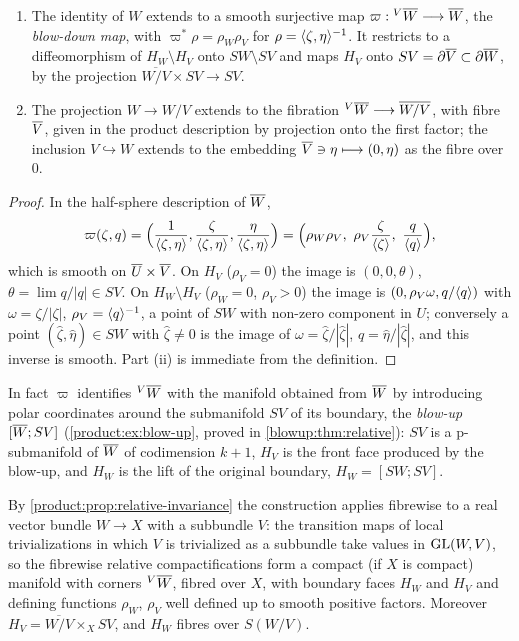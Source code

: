 \begin{proposition}\label{product:prop:blow-down}
\begin{enumerate}[label=\textup{(\roman*)}]
\item The identity of $W$ extends to a smooth surjective map
$\varpi:{}^{V}\overline{W}\longrightarrow\overline{W}$, the \emph{blow-down map}, with
$\varpi^*\rho=\rho_W\rho_V$ for $\rho=\langle \zeta,\eta\rangle^{-1}$. It restricts to a
diffeomorphism of $H_W\setminus H_V$ onto $SW\setminus SV$ and maps $H_V$ onto
$SV=\partial\overline{V}\subset\partial\overline{W}$, by the projection $\overline{W/V}\times SV
\longrightarrow SV$.
\item The projection $W\longrightarrow W/V$ extends to the fibration
${}^{V}\overline{W}\longrightarrow\overline{W/V}$, with fibre $\overline{V}$, given in the product
description by projection onto the first factor; the inclusion $V\hookrightarrow
W$ extends to the embedding $\overline{V}\ni\eta\longmapsto(0,\eta)$ as the fibre over
$0$.
\end{enumerate}
\end{proposition}

\begin{proof}
In the half-sphere description of $\overline{W}$,
\begin{equation*}
\varpi(\zeta,q)=\Big(\frac1{\ang{\zeta,\eta}},\frac{\zeta}{\ang{\zeta,\eta}},
\frac{\eta}{\ang{\zeta,\eta}}\Big)=\Big(\rho_W\rho_V,\ \rho_V\frac\zeta{\ang\zeta},
\ \frac q{\ang q}\Big),
\end{equation*}
which is smooth on $\overline{U}\times\overline{V}$. On $H_V$ ($\rho_V=0$) the image is
$(0,0,\theta)$, $\theta=\lim q/|q|\in SV$. On $H_W\setminus H_V$ ($\rho_W=0$,
$\rho_V>0$) the image is $(0,\rho_V\omega,q/\langle q\rangle)$ with $\omega=\zeta/|\zeta|$,
$\rho_V=\langle q\rangle^{-1}$, a point of $SW$ with non-zero component in $U$; conversely
a point $(\hat\zeta,\hat\eta)\in SW$ with $\hat\zeta\ne0$ is the image of
$\omega=\hat\zeta/|\hat\zeta|$, $q=\hat\eta/|\hat\zeta|$, and this inverse is smooth.
Part (ii) is immediate from the definition.
\end{proof}

In fact $\varpi$ identifies ${}^{V}\overline{W}$ with the manifold obtained from $\overline{W}$ by
introducing polar coordinates around the submanifold $SV$ of its boundary, the
\emph{blow-up} $[\overline{W};SV]$ (\cref{product:ex:blow-up}, proved in
\cref{blowup:thm:relative}): $SV$ is a p-submanifold of $\overline{W}$ of codimension
$k+1$, $H_V$ is the front face produced by the blow-up, and $H_W$ is the lift of the
original boundary, $H_W=[SW;SV]$.

\begin{remark}\label{product:rem:relative-bundle}
By \cref{product:prop:relative-invariance} the construction applies fibrewise to a
real vector bundle $W\longrightarrow X$ with a subbundle $V$: the transition maps
of local trivializations in which $V$ is trivialized as a subbundle take values in
$\operatorname{GL}(W,V)$, so the fibrewise relative compactifications form a compact (if $X$ is
compact) manifold with corners ${}^{V}\overline{W}$, fibred over $X$, with boundary faces
$H_W$ and $H_V$ and defining functions $\rho_W$, $\rho_V$ well defined up to
smooth positive factors. Moreover $H_V=\overline{W/V}\times_XSV$, and $H_W$
fibres over $S(W/V)$.
\end{remark}

